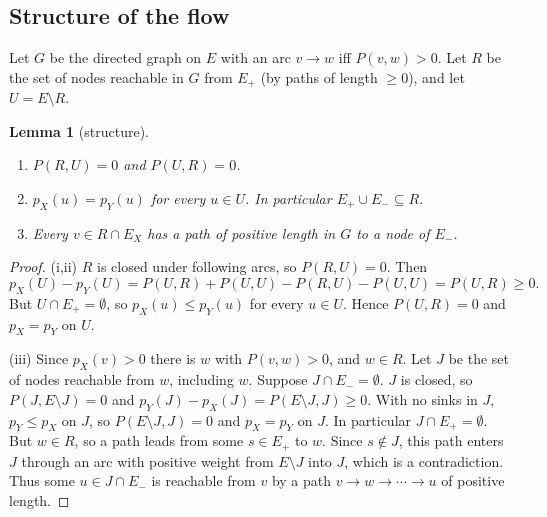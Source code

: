 \documentclass[11pt]{article}
\newtheorem{lemma}[theorem]{Lemma}
\theoremstyle{definition}
\newcommand{\pX}{p_X}
\newcommand{\pY}{p_Y}
\newcommand{\Ep}{E_{+}}
\newcommand{\Em}{E_{-}}
\begin{document}
\subsection{Structure of the flow}

Let $G$ be the directed graph on $E$ with an arc $v\to w$ iff $P(v,w)>0$. Let
$R$ be the set of nodes reachable in $G$ from $\Ep$ (by paths of length $\ge 0$),
and let $U=E\setminus R$.

\begin{lemma}[structure]\label{lem:structure}
\leavevmode
\begin{enumerate}[label=(\roman*)]
  \item $P(R,U)=0$ and $P(U,R)=0$.
  \item $\pX(u)=\pY(u)$ for every $u\in U$. In particular $\Ep\cup\Em\subseteq R$.
  \item Every $v\in R\cap E_X$ has a path of positive length in $G$ to a node of $\Em$.
\end{enumerate}
\end{lemma}
\begin{proof}
(i,ii) $R$ is closed under following arcs, so $P(R,U)=0$. Then
\[
\pX(U)-\pY(U)=P(U,R)+P(U,U)-P(R,U)-P(U,U)=P(U,R)\ge0.
\]
But $U\cap\Ep=\emptyset$, so $\pX(u)\le\pY(u)$ for every $u\in U$. Hence
$P(U,R)=0$ and $\pX=\pY$ on $U$.

(iii) Since $\pX(v)>0$ there is $w$ with $P(v,w)>0$, and $w\in R$. Let $J$ be the
set of nodes reachable from $w$, including $w$. Suppose $J\cap\Em=\emptyset$.
$J$ is closed, so $P(J,E\setminus J)=0$ and
$\pY(J)-\pX(J)=P(E\setminus J,J)\ge 0$. With no sinks in $J$, $\pY\le\pX$ on $J$,
so $P(E\setminus J,J)=0$ and $\pX=\pY$ on $J$. In particular $J\cap\Ep=\emptyset$.
But $w\in R$, so a path leads from some $s\in\Ep$ to $w$. Since $s\notin J$,
this path enters $J$ through an arc with positive weight from $E\setminus J$
into $J$, which is a contradiction. Thus some $u\in J\cap\Em$ is reachable from
$v$ by a path $v\to w\to\cdots\to u$ of positive length.
\end{proof}
\end{document}
